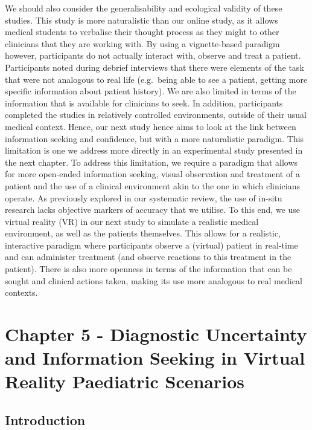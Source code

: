 \documentclass[a4paper, nobind]{templates/ociamthesis}
\begin{document}
We should also consider the generalisability and ecological validity of these studies. This study is more naturalistic than our online study, as it allows medical students to verbalise their thought process as they might to other clinicians that they are working with. By using a vignette-based paradigm however, participants do not actually interact with, observe and treat a patient. Participants noted during debrief interviews that there were elements of the task that were not analogous to real life (e.g.~being able to see a patient, getting more specific information about patient history). We are also limited in terms of the information that is available for clinicians to seek. In addition, participants completed the studies in relatively controlled environments, outside of their usual medical context. Hence, our next study hence aims to look at the link between information seeking and confidence, but with a more naturalistic paradigm. This limitation is one we address more directly in an experimental study presented in the next chapter. To address this limitation, we require a paradigm that allows for more open-ended information seeking, visual observation and treatment of a patient and the use of a clinical environment akin to the one in which clinicians operate. As previously explored in our systematic review, the use of in-situ research lacks objective markers of accuracy that we utilise. To this end, we use virtual reality (VR) in our next study to simulate a realistic medical environment, as well as the patients themselves. This allows for a realistic, interactive paradigm where participants observe a (virtual) patient in real-time and can administer treatment (and observe reactions to this treatment in the patient). There is also more openness in terms of the information that can be sought and clinical actions taken, making its use more analogous to real medical contexts.

\chapter{Chapter 5 - Diagnostic Uncertainty and Information Seeking in Virtual Reality Paediatric Scenarios}\label{chapter-5}

\adjustmtc
{}

\section{Introduction}\label{introduction-3}
\end{document}
